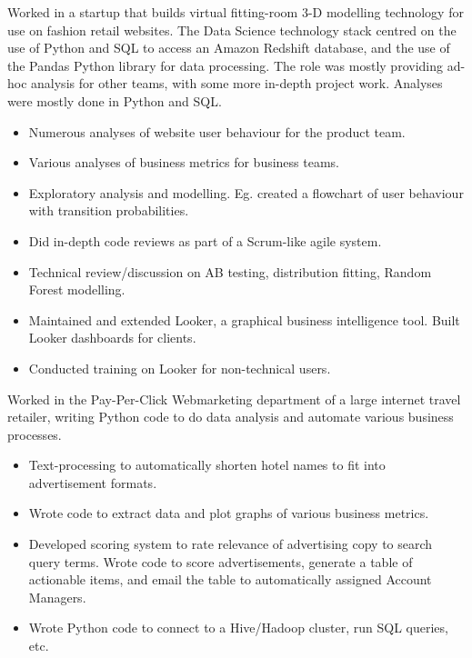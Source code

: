 \documentclass[11pt,a4paper,sans]{moderncv} %
\begin{document}
{Worked in a startup that builds virtual fitting-room 3-D modelling technology for use on fashion retail websites.  The Data Science technology stack centred on the use of Python and SQL to access an Amazon Redshift database, and the use of the Pandas Python library for data processing.  The role was mostly providing ad-hoc analysis for other teams, with some more in-depth project work.
Analyses were mostly done in Python and SQL.
\begin{itemize}
	\item Numerous analyses of website user behaviour for the product team.
	\item Various analyses of business metrics for business teams.
	\item Exploratory analysis and modelling. Eg. created a flowchart of user behaviour with transition probabilities.
	\item Did in-depth code reviews as part of a Scrum-like agile system.
	\item Technical review/discussion on AB testing, distribution fitting, Random Forest modelling.
	\item Maintained and extended Looker, a graphical business intelligence tool. Built Looker dashboards for clients.
	\item Conducted training on Looker for non-technical users.
\end{itemize}
}

{Worked in the Pay-Per-Click Webmarketing department of a large internet travel retailer, writing Python code to do data analysis and automate various business processes.
\begin{itemize}
	\item Text-processing to automatically shorten hotel names to fit into advertisement formats.
	\item Wrote code to extract data and plot graphs of various business metrics.
	\item Developed scoring system to rate relevance of advertising copy to search query terms.  Wrote code to score advertisements, generate a table of actionable items, and email the table to automatically assigned Account Managers.
	\item Wrote Python code to connect to a Hive/Hadoop cluster, run SQL queries, etc.
\end{itemize}
}
\vspace{0.2em}
\end{document}
